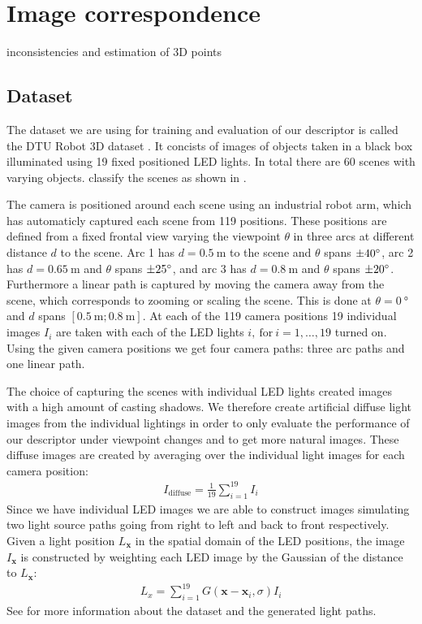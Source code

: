 \documentclass[thesis.tex]{subfiles}
\begin{document}
\chapter{Image correspondence}

inconsistencies and estimation of 3D points

\section{Dataset}
The dataset we are using for training and evaluation of our descriptor is called the DTU Robot 3D dataset \cite{aanaes2010recall}. It concists of images of objects taken in a black box illuminated using 19 fixed positioned LED lights. In total there are 60 scenes with varying objects. \citet{aanaes2010ground} classify the scenes as shown in .

The camera is positioned around each scene using an industrial robot arm, which has automaticly captured each scene from 119 positions. These positions are defined from a fixed frontal view varying the viewpoint $\theta$ in three arcs at different distance $d$ to the scene. Arc 1 has $d = \SI{0.5}{\meter}$ to the scene and $\theta$ spans $\SI{\pm40}{\degree}$, arc 2 has $d = \SI{0.65}{\meter}$ and $\theta$ spans $\SI{\pm25}{\degree}$, and arc 3 has $d = \SI{0.8}{\meter}$ and $\theta$ spans $\SI{\pm20}{\degree}$. Furthermore a linear path is captured by moving the camera away from the scene, which corresponds to zooming or scaling the scene. This is done at $\theta = \SI{0}{\degree}$ and $d$ spans $[\SI{0.5}{\meter};\SI{0.8}{\meter} ]$. At each of the 119 camera positions 19 individual images $I_i$ are taken with each of the LED lights $i,~\text{for}~i = 1,\hdots,19$ turned on. Using the given camera positions we get four camera paths: three arc paths and one linear path.


The choice of capturing the scenes with individual LED lights created images with a high amount of casting shadows. We therefore create artificial diffuse light images from the individual lightings in order to only evaluate the performance of our descriptor under viewpoint changes and to get more natural images. These diffuse images are created by averaging over the individual light images for each camera position:
\begin{align}
	I_{\text{diffuse}} = \frac{1}{19} \sum_{i = 1}^{19} I_{i}
\end{align}
Since we have individual LED images we are able to construct images simulating two light source paths going from right to left and back to front respectively.
Given a light position $L_{\boldsymbol{x}}$ in the spatial domain of the LED positions, the image $I_{\boldsymbol{x}}$ is constructed by weighting each LED image by the Gaussian of the distance to $L_{\boldsymbol{x}}$:
\begin{align}
	L_{x} = \sum_{i = 1}^{19} G(\boldsymbol{x} - \boldsymbol{x}_i,\sigma) I_{i}
\end{align}
See \citet{aanaes2010ground} for more information about the dataset and the generated light paths.
\end{document}
